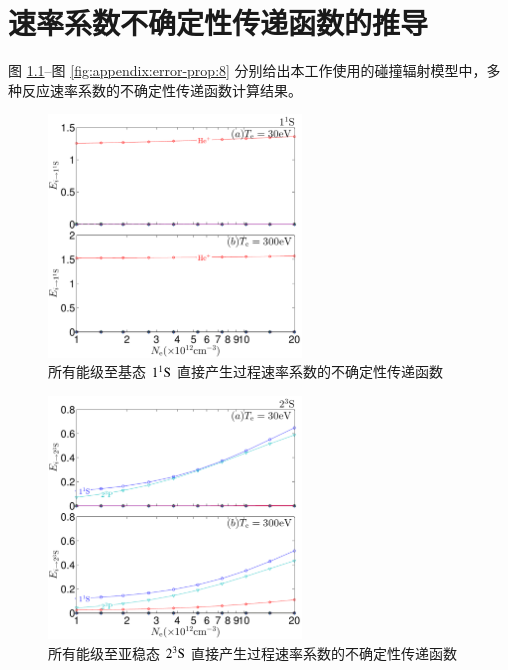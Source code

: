 \graphicspath{{figures/appendix-error-propgate/}}

\chapter{速率系数不确定性传递函数的推导}
\label{appendix:error-propagate}

图 \ref{fig:appendix:error-prop:1}--图 \ref{fig:appendix:error-prop:8} 分别给出本工作使用的碰撞辐射模型中，多种反应速率系数的不确定性传递函数计算结果。

\begin{figure}[H]
    \centering
    \includegraphics[width=0.6\textwidth]{11S-error-propagation-coefficient.pdf}
    \caption{所有能级至基态 $1^1{\rm S}$ 直接产生过程速率系数的不确定性传递函数}
    \label{fig:appendix:error-prop:1}
\end{figure}

\begin{figure}[H]
    \centering
    \includegraphics[width=0.6\textwidth]{23S-error-propagation-coefficient.pdf}
    \caption{所有能级至亚稳态 $2^3{\rm S}$ 直接产生过程速率系数的不确定性传递函数}
    \label{fig:appendix:error-prop:2}
\end{figure}

